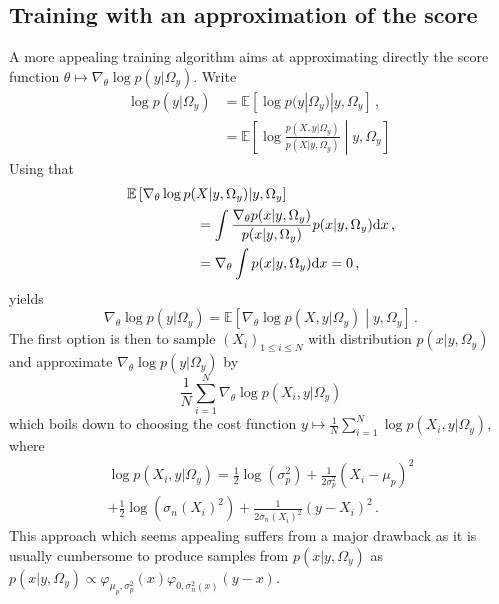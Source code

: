 \documentclass[review]{cvpr}
\begin{document}
\subsection{Training with an approximation of the score}
A more appealing training algorithm aims at approximating directly the score function $\theta\mapsto \nabla_{\theta} \log p(y|\Omega_y)$. Write
\begin{align*}
\log p(y|\Omega_y) &= \mathbb{E}[\log p(y|\Omega_y)|y,\Omega_y]\,,\\
&= \mathbb{E}\left[\log \frac{p(X,y|\Omega_y)}{p(X|y,\Omega_y)}\middle |y,\Omega_y\right]\;
\end{align*}
Using that
\begin{align*}
\mathbb{E}&\left[\nabla_{\theta}\log p(X|y,\Omega_y)\middle |y,\Omega_y\right] \\
&\hspace{1.5cm}= \int \frac{ \nabla_{\theta} p(x|y,\Omega_y)}{p(x|y,\Omega_y)}p(x|y,\Omega_y)\mathrm{d}x\,,\\
&\hspace{1.5cm} = \nabla_{\theta} \int  p(x|y,\Omega_y)\mathrm{d}x = 0\,,
\end{align*}
yields
$$
\nabla_{\theta}\log p(y|\Omega_y) = \mathbb{E}\left[\nabla_{\theta}\log p(X,y|\Omega_y)\middle |y,\Omega_y\right]\,.
$$
The first option is then to sample $(X_i)_{1\leqslant i \leqslant N}$ with distribution $p(x|y,\Omega_y)$ and approximate $\nabla_{\theta}\log p(y|\Omega_y)$ by 
$$
\frac{1}{N}\sum_{i=1}^N \nabla_{\theta}\log p(X_i,y|\Omega_y)
$$
which boils down to choosing the cost function $y \mapsto \frac{1}{N}\sum_{i=1}^N \log p(X_i,y|\Omega_y)$, where
\begin{multline*}
\log p(X_i,y|\Omega_y) = \frac{1}{2}\log(\sigma_p^2) + \frac{1}{2\sigma_p^2}(X_i-\mu_p)^2 \\ + \frac{1}{2}\log(\sigma_n(X_i)^2) + \frac{1}{2\sigma_n(X_i)^2}(y-X_i)^2 \,. 
\end{multline*}
This approach which seems appealing suffers from a major drawback as it is usually cumbersome to produce samples from $p(x|y,\Omega_y)$ as $p(x|y,\Omega_y)\propto \varphi_{\mu_p,\sigma_p^2}(x)\varphi_{0,\sigma_n^2(x)}(y-x)$.
\end{document}
